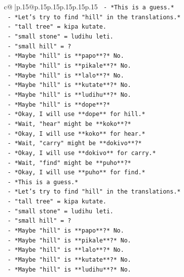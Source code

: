 \documentclass{article}
\begin{document}
{\begin{supertabular}{c@{$\;$}|p{.15\linewidth}@{}p{.15\linewidth}p{.15\linewidth}p{.15\linewidth}p{.15\linewidth}p{.15\linewidth}}
{{{\texttt{       {-} *This is a guess.*} \\
\texttt{       {-} *Let's try to find "hill" in the translations.*} \\
\texttt{       {-} "tall tree" = kipa kutate.} \\
\texttt{       {-} "small stone" = ludihu leti.} \\
\texttt{       {-} "small hill" = ?} \\
\texttt{       {-} *Maybe "hill" is **papo**?* No.} \\
\texttt{       {-} *Maybe "hill" is **pikale**?* No.} \\
\texttt{       {-} *Maybe "hill" is **lalo**?* No.} \\
\texttt{       {-} *Maybe "hill" is **kutate**?* No.} \\
\texttt{       {-} *Maybe "hill" is **ludihu**?* No.} \\
\texttt{       {-} *Maybe "hill" is **dope**?*} \\
\texttt{       {-} *Okay, I will use **dope** for hill.*} \\
\texttt{       {-} *Wait, "hear" might be **koko**?*} \\
\texttt{       {-} *Okay, I will use **koko** for hear.*} \\
\texttt{       {-} *Wait, "carry" might be **dokivo**?*} \\
\texttt{       {-} *Okay, I will use **dokivo** for carry.*} \\
\texttt{       {-} *Wait, "find" might be **puho**?*} \\
\texttt{       {-} *Okay, I will use **puho** for find.*} \\
\texttt{       {-} *This is a guess.*} \\
\texttt{       {-} *Let's try to find "hill" in the translations.*} \\
\texttt{       {-} "tall tree" = kipa kutate.} \\
\texttt{       {-} "small stone" = ludihu leti.} \\
\texttt{       {-} "small hill" = ?} \\
\texttt{       {-} *Maybe "hill" is **papo**?* No.} \\
\texttt{       {-} *Maybe "hill" is **pikale**?* No.} \\
\texttt{       {-} *Maybe "hill" is **lalo**?* No.} \\
\texttt{       {-} *Maybe "hill" is **kutate**?* No.} \\
\texttt{       {-} *Maybe "hill" is **ludihu**?* No.} \\
}}}
\end{supertabular}}
\end{document}
